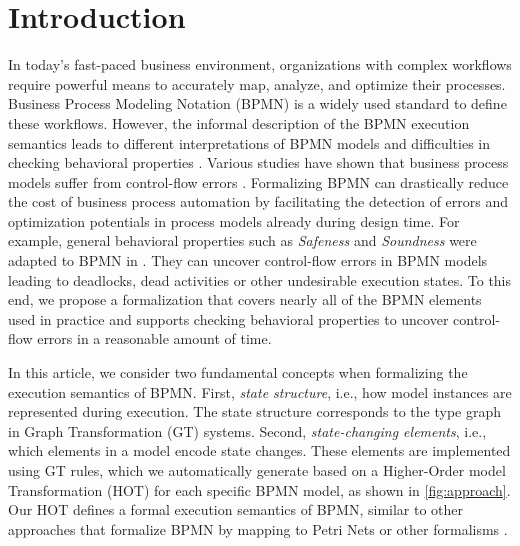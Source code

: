 \documentclass{lmcs} %
\begin{document}
\section{Introduction} \label{sec:introduction}
In today's fast-paced business environment, organizations with complex workflows require powerful means to accurately map, analyze, and optimize their processes. 
Business Process Modeling Notation (BPMN) \cite{objectmanagementgroupBusinessProcessModel2013} is a widely used standard to define these workflows.
However, the informal description of the BPMN execution semantics leads to different interpretations of BPMN models and difficulties in checking behavioral properties \cite{corradiniFormalApproachAnalysis2021}.
Various studies have shown that business process models suffer from control-flow errors \cite{mendlingEmpiricalStudiesProcess2009}.
Formalizing BPMN can drastically reduce the cost of business process automation by facilitating the detection of errors and optimization potentials in process models already during design time.
For example, general behavioral properties such as \textit{Safeness} and \textit{Soundness} were adapted to BPMN in \cite{corradiniClassificationBPMNCollaborations2018}.
They can uncover control-flow errors in BPMN models leading to deadlocks, dead activities or other undesirable execution states.
To this end, we propose a formalization that covers nearly all of the BPMN elements used in practice and supports checking behavioral properties to uncover control-flow errors in a reasonable amount of time.

In this article, we consider two fundamental concepts when formalizing the execution semantics of BPMN.
First, \textit{state structure}, i.e., how model instances are represented during execution.
The state structure corresponds to the type graph in Graph Transformation (GT) systems.
Second, \textit{state-changing elements}, i.e., which elements in a model encode state changes.
These elements are implemented using GT rules, which we automatically generate based on a Higher-Order model Transformation (HOT) \cite{tisiUseHigherOrderModel2009} for each specific BPMN model, as shown in \autoref{fig:approach}.
Our HOT defines a formal execution semantics of BPMN, similar to other approaches that formalize BPMN by mapping to Petri Nets or other formalisms \cite{dijkmanSemanticsAnalysisBusiness2008}.
\end{document}
